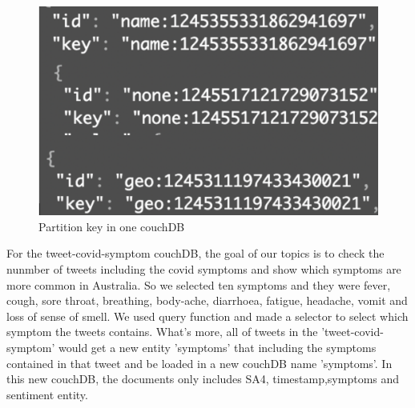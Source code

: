 \begin{figure}[H]
    \centering
    \includegraphics[scale=0.4]{city_analytics/report/images/partitionkey.png}
    \caption{Partition key in one couchDB}
    \label{fig:my_label}
\end{figure}

For the tweet-covid-symptom couchDB, the goal of our topics is to check the nunmber of tweets including the covid symptoms and show which symptoms are more common in Australia. So we selected ten symptoms and they were fever, cough, sore throat, breathing, body-ache, diarrhoea, fatigue, headache, vomit and loss of sense of smell. We used query function and made a selector to select which symptom the tweets contains. What's more, all of tweets in the 'tweet-covid-symptom' would get a new entity 'symptoms' that including the symptoms contained in that tweet and be loaded in a new couchDB name 'symptoms'. In this new couchDB, the documents only includes SA4, timestamp,symptoms and sentiment entity.

